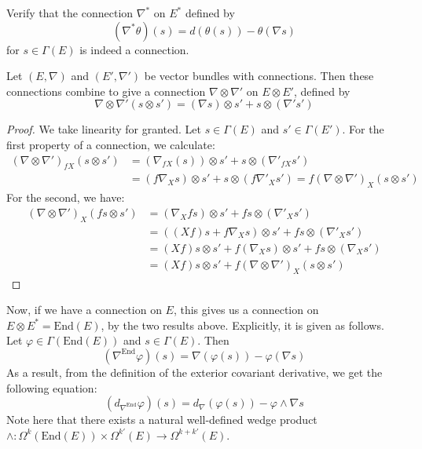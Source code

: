 \begin{exercise}
  Verify that the connection $\nabla^*$ on $E^*$ defined by
  $$(\nabla^*\theta)(s)=d(\theta(s))-\theta(\nabla s)$$
  for $s\in\Gamma(E)$ is indeed a connection.
\end{exercise}
\begin{proposition}
  Let $(E,\nabla)$ and $(E',\nabla')$ be vector bundles with connections. Then these connections combine to give a connection $\nabla\otimes\nabla'$ on $E\otimes E'$, defined by
  $$\nabla\otimes\nabla'(s\otimes s')=(\nabla s)\otimes s'+s\otimes(\nabla's')$$
\end{proposition}
\begin{proof}
  We take linearity for granted. Let $s\in\Gamma(E)$ and $s'\in\Gamma(E')$. For the first property of a connection, we calculate:
  \begin{align*}
    (\nabla\otimes\nabla')_{fX}(s\otimes s') &= (\nabla_{fX}(s))\otimes s'+s\otimes(\nabla'_{fX} s') \\
                                             &= (f\nabla_Xs)\otimes s'+s\otimes(f\nabla'_Xs')=f(\nabla\otimes\nabla')_X(s\otimes s')
  \end{align*}
  For the second, we have:
  \begin{align*}
    (\nabla\otimes\nabla')_X(fs\otimes s')&= (\nabla_Xfs)\otimes s'+fs\otimes(\nabla'_Xs') \\
                                          &= ((Xf)s+f\nabla_Xs)\otimes s'+fs\otimes(\nabla'_Xs') \\
                                          &= (Xf)s\otimes s'+f(\nabla_Xs)\otimes s'+fs\otimes(\nabla_Xs') \\
                                          &= (Xf)s\otimes s'+f(\nabla\otimes\nabla')_X(s\otimes s')
  \end{align*}
\end{proof}
Now, if we have a connection on $E$, this gives us a connection on $E\otimes E^*=\text{End}(E)$, by the two results above. Explicitly, it is given as follows. Let $\varphi\in\Gamma(\text{End}(E))$ and $s\in\Gamma(E)$. Then
$$(\nabla^\text{End}\varphi)(s)=\nabla(\varphi(s))-\varphi(\nabla s)$$
As a result, from the definition of the exterior covariant derivative, we get the following equation:
\begin{equation}\label{eq:1}
  (d_{\nabla^\text{End}}\varphi)(s)=d_\nabla(\varphi(s))-\varphi\wedge\nabla s
\end{equation}
Note here that there exists a natural well-defined wedge product $\wedge:\Omega^k(\text{End}(E))\times\Omega^{k'}(E)\to\Omega^{k+k'}(E)$.
